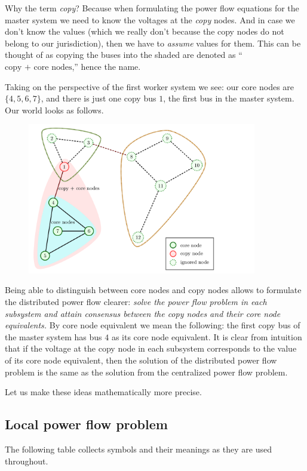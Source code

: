 \documentclass{article}
\begin{document}
Why the term \emph{copy}?
Because when formulating the power flow equations for the master system we need to know the voltages at the \emph{copy} nodes.
And in case we don't know the values (which we really don't because the copy nodes do not belong to our jurisdiction), then we have to \emph{assume} values for them.
This can be thought of as copying the buses into the shaded are denoted as ``$\text{copy + core nodes}$,'' hence the name.

Taking on the perspective of the first worker system we see: our core nodes are $\{ 4, 5, 6, 7 \}$, and there is just one copy bus $1$, the first bus in the master system.
Our world looks as follows.

\begin{figure}
    \includegraphics[width=10cm]{visualization/version_2.png}
\end{figure}

Being able to distinguish between core nodes and copy nodes allows to formulate the distributed power flow clearer: \emph{solve the power flow problem in each subsystem and attain consensus between the copy nodes and their core node equivalents.}
By core node equivalent we mean the following: the first copy bus of the master system has bus $4$ as its core node equivalent.
It is clear from intuition that if the voltage at the copy node in each subsystem corresponds to the value of its core node equivalent, then the solution of the distributed power flow problem is the same as the solution from the centralized power flow problem.

Let us make these ideas mathematically more precise.

\subsection{Local power flow problem}

The following table collects symbols and their meanings as they are used throughout.
\end{document}
